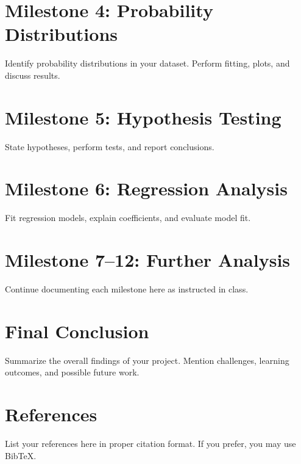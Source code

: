 \documentclass[12pt,a4paper]{article}
\begin{document}





















































\section{Milestone 4: Probability Distributions}
Identify probability distributions in your dataset. Perform fitting, plots, and discuss results.

\section{Milestone 5: Hypothesis Testing}
State hypotheses, perform tests, and report conclusions.

\section{Milestone 6: Regression Analysis}
Fit regression models, explain coefficients, and evaluate model fit.

\section{Milestone 7--12: Further Analysis}
Continue documenting each milestone here as instructed in class.

\section{Final Conclusion}
Summarize the overall findings of your project. Mention challenges, learning outcomes, and possible future work.

\newpage
\section*{References}
List your references here in proper citation format. If you prefer, you may use BibTeX.
\end{document}
